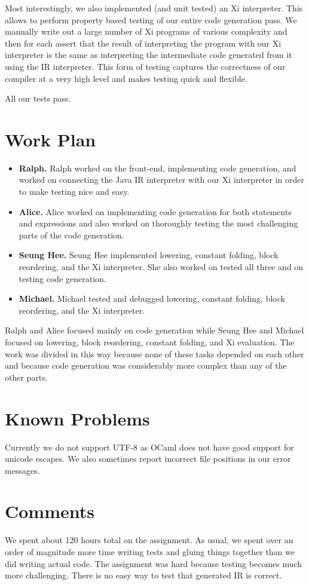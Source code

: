 \documentclass{hw}
\begin{document}
Most interestingly, we also implemented (and unit tested) an Xi interpreter.
This allows to perform property based testing of our entire code generation
pass. We manually write out a large number of Xi programs of various complexity
and then for each assert that the result of interpreting the program with our
Xi interpreter is the same as interpreting the intermediate code generated from
it using the IR interpreter. This form of testing captures the correctness of
our compiler at a very high level and makes testing quick and flexible.

All our tests pass.

\section{Work Plan}\label{sec:workplan}
\begin{itemize}
  \item \textbf{Ralph.}
    Ralph worked on the front-end, implementing code generation, and worked on
    connecting the Java IR interpreter with our Xi interpreter in order to make
    testing nice and easy.

  \item \textbf{Alice.}
    Alice worked on implementing code generation for both statements and
    expressions and also worked on thoroughly testing the most challenging
    parts of the code generation.

  \item \textbf{Seung Hee.}
    Seung Hee implemented lowering, constant folding, block reordering, and the
    Xi interpreter. She also worked on tested all three and on testing code
    generation.

  \item \textbf{Michael.}
    Michael tested and debugged lowering, constant folding, block reordering,
    and the Xi interpreter.
\end{itemize}
Ralph and Alice focused mainly on code generation while Seung Hee and Michael
focused on lowering, block reordering, constant folding, and Xi evaluation. The
work was divided in this way because none of these tasks depended on each other
and because code generation was considerably more complex than any of the other
parts.

\section{Known Problems}\label{sec:problems}
Currently we do not support UTF-8 as OCaml does not have good support for
unicode escapes. We also sometimes report incorrect file positions in our error
messages.

\section{Comments}\label{sec:comments}
We spent about 120 hours total on the assignment. As usual, we spent over an
order of magnitude more time writing tests and gluing things together than we
did writing actual code. The assignment was hard because testing becomes much
more challenging. There is no easy way to test that generated IR is correct.
\end{document}
